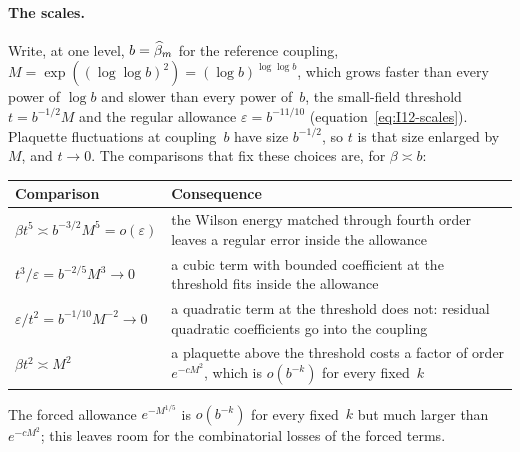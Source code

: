 \paragraph{The scales.}
Write, at one level, $b=\widehat{\beta}_m$ for the reference coupling, $M=\exp((\log\log b)^2)=(\log b)^{\log\log b}$, which grows faster than every power of $\log b$ and slower than every power of~$b$, the small-field threshold $t=b^{-1/2}M$ and the regular allowance $\varepsilon=b^{-11/10}$ (equation~\eqref{eq:I12-scales}). Plaquette fluctuations at coupling~$b$ have size $b^{-1/2}$, so $t$ is that size enlarged by~$M$, and $t\to0$. The comparisons that fix these choices are, for $\beta\asymp b$:
\begin{center}\small
\begin{tabular}{@{}p{}p{}@{}}
\toprule
Comparison & Consequence\\
\midrule
$\beta t^5\asymp b^{-3/2}M^5=o(\varepsilon)$ & the Wilson energy matched through fourth order leaves a regular error inside the allowance\\
$t^3/\varepsilon=b^{-2/5}M^3\to0$ & a cubic term with bounded coefficient at the threshold fits inside the allowance\\
$\varepsilon/t^2=b^{-1/10}M^{-2}\to0$ & a quadratic term at the threshold does not: residual quadratic coefficients go into the coupling\\
$\beta t^2\asymp M^2$ & a plaquette above the threshold costs a factor of order $e^{-cM^2}$, which is $o(b^{-k})$ for every fixed~$k$\\
\bottomrule
\end{tabular}
\end{center}
The forced allowance $e^{-M^{1/5}}$ is $o(b^{-k})$ for every fixed~$k$ but much larger than $e^{-cM^2}$; this leaves room for the combinatorial losses of the forced terms.

